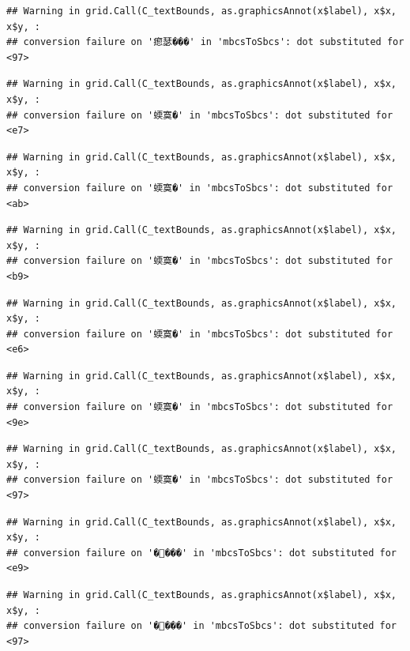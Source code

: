 \documentclass[
]{article}
\begin{document}
\begin{verbatim}
## Warning in grid.Call(C_textBounds, as.graphicsAnnot(x$label), x$x, x$y, :
## conversion failure on '瘛瑟���' in 'mbcsToSbcs': dot substituted for <97>
\end{verbatim}

\begin{verbatim}
## Warning in grid.Call(C_textBounds, as.graphicsAnnot(x$label), x$x, x$y, :
## conversion failure on '蝡寞�' in 'mbcsToSbcs': dot substituted for <e7>
\end{verbatim}

\begin{verbatim}
## Warning in grid.Call(C_textBounds, as.graphicsAnnot(x$label), x$x, x$y, :
## conversion failure on '蝡寞�' in 'mbcsToSbcs': dot substituted for <ab>
\end{verbatim}

\begin{verbatim}
## Warning in grid.Call(C_textBounds, as.graphicsAnnot(x$label), x$x, x$y, :
## conversion failure on '蝡寞�' in 'mbcsToSbcs': dot substituted for <b9>
\end{verbatim}

\begin{verbatim}
## Warning in grid.Call(C_textBounds, as.graphicsAnnot(x$label), x$x, x$y, :
## conversion failure on '蝡寞�' in 'mbcsToSbcs': dot substituted for <e6>
\end{verbatim}

\begin{verbatim}
## Warning in grid.Call(C_textBounds, as.graphicsAnnot(x$label), x$x, x$y, :
## conversion failure on '蝡寞�' in 'mbcsToSbcs': dot substituted for <9e>
\end{verbatim}

\begin{verbatim}
## Warning in grid.Call(C_textBounds, as.graphicsAnnot(x$label), x$x, x$y, :
## conversion failure on '蝡寞�' in 'mbcsToSbcs': dot substituted for <97>
\end{verbatim}

\begin{verbatim}
## Warning in grid.Call(C_textBounds, as.graphicsAnnot(x$label), x$x, x$y, :
## conversion failure on '����' in 'mbcsToSbcs': dot substituted for <e9>
\end{verbatim}

\begin{verbatim}
## Warning in grid.Call(C_textBounds, as.graphicsAnnot(x$label), x$x, x$y, :
## conversion failure on '����' in 'mbcsToSbcs': dot substituted for <97>
\end{verbatim}
\end{document}
